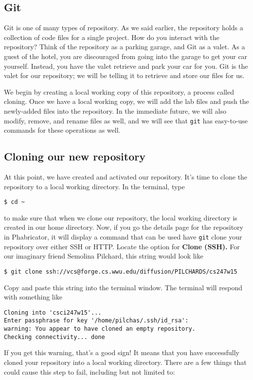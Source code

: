 \documentclass[12pt]{article}
\begin{document}
\subsection{Git}
Git is one of many types of repository.  As we said earlier, the repository holds a collection of code files for a single project.  How do you interact with the repository?  Think of the repository as a parking garage, and Git as a valet.  As a guest of the hotel, you are discouraged from going into the garage to get your car yourself.  Instead, you have the valet retrieve and park your car for you.  Git is the valet for our repository; we will be telling it to retrieve and store our files for us.

We begin by creating a local working copy of this repository, a process called cloning.  Once we have a local working copy, we will add the lab files and push the newly-added files into the repository.  In the immediate future, we will also modify, remove, and rename files as well, and we will see that \verb|git| has easy-to-use commands for these operations as well.

\subsection{Cloning our new repository}
At this point, we have created and activated our repository.  It's time to clone the repository to a local working directory.  In the terminal, type
\begin{verbatim}
$ cd ~
\end{verbatim}
to make sure that when we clone our repository, the local working directory is created in our home directory.  Now, if you go the details page for the repository in Phabricator, it will display a command that can be used have \verb|git| clone your repository over either SSH or HTTP.  Locate the option for \textbf{Clone (SSH).} For our imaginary friend Semolina Pilchard, this string would look like

\begin{verbatim}
$ git clone ssh://vcs@forge.cs.wwu.edu/diffusion/PILCHARDS/cs247w15
\end{verbatim}

Copy and paste this string into the terminal window.  The terminal will respond with something like
\begin{verbatim}
Cloning into 'csci247w15'...
Enter passphrase for key '/home/pilchas/.ssh/id_rsa': 
warning: You appear to have cloned an empty repository.
Checking connectivity... done
\end{verbatim}
If you get this warning, that's a good sign!  It means that you have successfully cloned your repository into a local working directory.  There are a few things that could cause this step to fail, including but not limited to:
\end{document}
